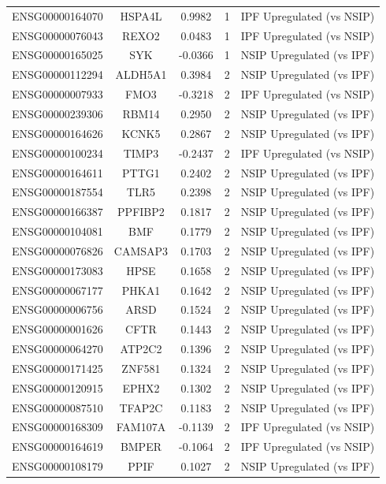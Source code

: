 \documentclass[
]{article}
\begin{document}
\begin{singlespace}
\begin{longtable}[t]{lcccl}
\endfoot
\bottomrule
\endlastfoot
ENSG00000164070 & HSPA4L & 0.9982 & 1 & IPF Upregulated (vs NSIP)\\
ENSG00000076043 & REXO2 & 0.0483 & 1 & IPF Upregulated (vs NSIP)\\
ENSG00000165025 & SYK & -0.0366 & 1 & NSIP Upregulated (vs IPF)\\
ENSG00000112294 & ALDH5A1 & 0.3984 & 2 & NSIP Upregulated (vs IPF)\\
ENSG00000007933 & FMO3 & -0.3218 & 2 & IPF Upregulated (vs NSIP)\\
\addlinespace
ENSG00000239306 & RBM14 & 0.2950 & 2 & NSIP Upregulated (vs IPF)\\
ENSG00000164626 & KCNK5 & 0.2867 & 2 & NSIP Upregulated (vs IPF)\\
ENSG00000100234 & TIMP3 & -0.2437 & 2 & IPF Upregulated (vs NSIP)\\
ENSG00000164611 & PTTG1 & 0.2402 & 2 & NSIP Upregulated (vs IPF)\\
ENSG00000187554 & TLR5 & 0.2398 & 2 & NSIP Upregulated (vs IPF)\\
\addlinespace
ENSG00000166387 & PPFIBP2 & 0.1817 & 2 & NSIP Upregulated (vs IPF)\\
ENSG00000104081 & BMF & 0.1779 & 2 & NSIP Upregulated (vs IPF)\\
ENSG00000076826 & CAMSAP3 & 0.1703 & 2 & NSIP Upregulated (vs IPF)\\
ENSG00000173083 & HPSE & 0.1658 & 2 & NSIP Upregulated (vs IPF)\\
ENSG00000067177 & PHKA1 & 0.1642 & 2 & NSIP Upregulated (vs IPF)\\
\addlinespace
ENSG00000006756 & ARSD & 0.1524 & 2 & NSIP Upregulated (vs IPF)\\
ENSG00000001626 & CFTR & 0.1443 & 2 & NSIP Upregulated (vs IPF)\\
ENSG00000064270 & ATP2C2 & 0.1396 & 2 & NSIP Upregulated (vs IPF)\\
ENSG00000171425 & ZNF581 & 0.1324 & 2 & NSIP Upregulated (vs IPF)\\
ENSG00000120915 & EPHX2 & 0.1302 & 2 & NSIP Upregulated (vs IPF)\\
\addlinespace
ENSG00000087510 & TFAP2C & 0.1183 & 2 & NSIP Upregulated (vs IPF)\\
ENSG00000168309 & FAM107A & -0.1139 & 2 & IPF Upregulated (vs NSIP)\\
ENSG00000164619 & BMPER & -0.1064 & 2 & IPF Upregulated (vs NSIP)\\
ENSG00000108179 & PPIF & 0.1027 & 2 & NSIP Upregulated (vs IPF)\\

\end{longtable}
\end{singlespace}
\end{document}
